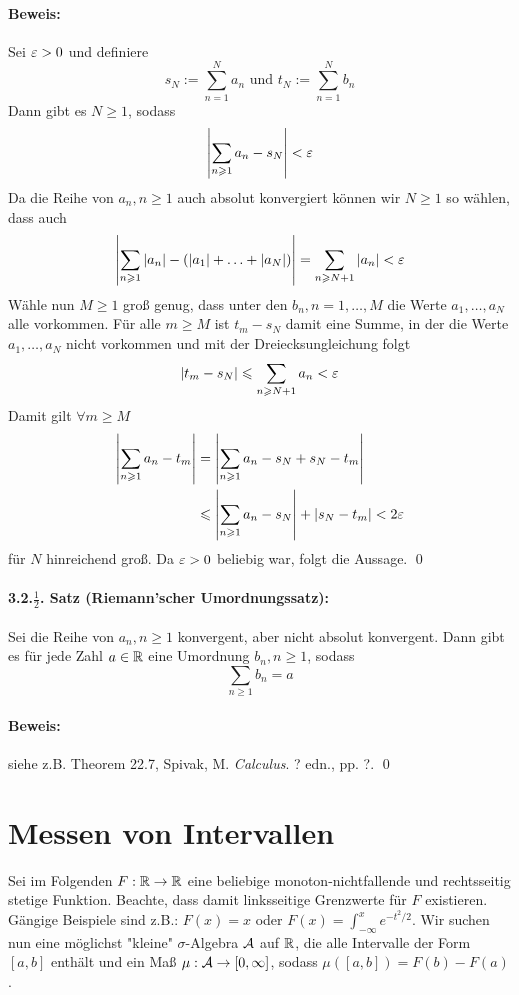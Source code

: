 \documentclass[12pt]{report}
\begin{document}
\paragraph{Beweis:} Sei $\varepsilon>0$ und definiere
$$s_N:=\sum_{n=1}^Na_n\text{ und }t_N:=\sum_{n=1}^Nb_n$$
Dann gibt es $N\geq1$, sodass
$$\left|\sum_{n\geqslant1}a_n-s_N\right|<\varepsilon$$
Da die Reihe von $a_n,n\geq1$ auch absolut konvergiert k\"onnen wir $N\geq1$ so w\"ahlen, dass auch
$$\left|\sum_{n\geqslant1}|a_n|-(|a_1|+\hdots+|a_N|)\right|=\sum_{n\geqslant N+1}|a_n|<\varepsilon$$
W\"ahle nun $M\geq1$ gro\ss{} genug, dass unter den $b_n,n=1,\hdots,M$ die Werte $a_1,\hdots,a_N$ alle vorkommen. F\"ur alle $m\geq M$ ist $t_m-s_N$ damit eine Summe, in der die Werte $a_1,\hdots,a_N$ nicht vorkommen und mit der Dreiecksungleichung folgt 
$$|t_m-s_N|\leqslant\sum_{n\geqslant N+1}a_n<\varepsilon$$
Damit gilt $\forall m\geq M$
\begin{align*}
    \left|\sum_{n\geqslant1}a_n-t_m\right|&=\left|\sum_{n\geqslant1}a_n-s_N+s_N-t_m\right|\\
    &\leqslant\left|\sum_{n\geqslant1}a_n-s_N\right|+\left|s_N-t_m\right|<2\varepsilon
\end{align*}
f\"ur $N$ hinreichend gro\ss{}. Da $\varepsilon>0$ beliebig war, folgt die Aussage. \qed

\paragraph{3.2.$\frac{1}{2}$. Satz (Riemann'scher Umordnungssatz):}Sei die Reihe von $a_n,n\geq1$ konvergent, aber nicht absolut konvergent. Dann gibt es f\"ur jede Zahl $a\in\mathbb{R}$ eine Umordnung $b_n,n\geq1$, sodass
$$\sum_{n\geq1}b_n=a$$

\paragraph{Beweis:}siehe z.B. Theorem 22.7, Spivak, M. \textit{Calculus}. ? edn., pp. ?. \qed

\section*{Messen von Intervallen}
Sei im Folgenden $F:\mathbb{R}\to\mathbb{R}$ eine beliebige monoton-nichtfallende und rechtsseitig stetige Funktion. Beachte, dass damit linksseitige Grenzwerte f\"ur $F$ existieren. G\"angige Beispiele sind z.B.: $F(x)=x$ oder $F(x)=\int_{-\infty}^xe^{-t^2/2}$. Wir suchen nun eine m\"oglichst "kleine" $\sigma$-Algebra $\mathcal{A}$ auf $\mathbb{R}$, die alle Intervalle der Form $[a,b]$ enth\"alt und ein Ma\ss{} $\mu:\mathcal{A}\to[0,\infty]$, sodass $\mu([a,b])=F(b)-F(a)$.
\end{document}
